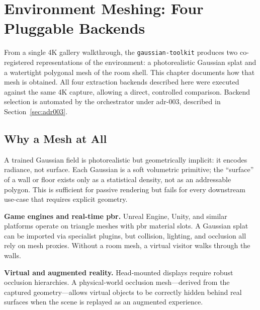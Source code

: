 
\chapter{Environment Meshing: Four Pluggable Backends}
\label{ch:meshing}

From a single 4K gallery walkthrough, the \texttt{gaussian-toolkit} produces two co-registered representations of the environment: a photorealistic Gaussian splat and a watertight polygonal mesh of the room shell. This chapter documents how that mesh is obtained. All four extraction backends described here were executed against the same 4K capture, allowing a direct, controlled comparison. Backend selection is automated by the orchestrator under \acrshort{adr}-003, described in Section~\ref{sec:adr003}.

\section{Why a Mesh at All}
\label{sec:meshing-why}

A trained Gaussian field is photorealistic but geometrically implicit: it encodes radiance, not surface. Each Gaussian is a soft volumetric primitive; the ``surface'' of a wall or floor exists only as a statistical density, not as an addressable polygon. This is sufficient for passive rendering but fails for every downstream use-case that requires explicit geometry.

\textbf{Game engines and real-time \acrshort{pbr}.} Unreal Engine, Unity, and similar platforms operate on triangle meshes with \acrshort{pbr} material slots. A Gaussian splat can be imported via specialist plugins, but collision, lighting, and occlusion all rely on mesh proxies. Without a room mesh, a virtual visitor walks through the walls.

\textbf{Virtual and augmented reality.} Head-mounted displays require robust occlusion hierarchies. A physical-world occlusion mesh---derived from the captured geometry---allows virtual objects to be correctly hidden behind real surfaces when the scene is replayed as an augmented experience.

